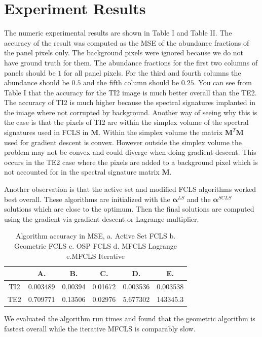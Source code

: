\documentclass[journal]{IEEEtran}
\begin{document}
\section{Experiment Results}
The numeric experimental results are shown in Table I and Table II. The accuracy of the result was computed as the MSE of the abundance fractions of the panel pixels only. The background pixels were ignored because we do not have ground truth for them. The abundance fractions for the first two columns of panels should be \(1\) for all panel pixels. For the third and fourth columns the abundance should be \(0.5\) and the fifth column should be \(0.25\). You can see from Table I that the accuracy for the TI2 image is much better overall than the TE2. The accuracy of TI2 is much higher because the spectral signatures implanted in the image where not corrupted by background. Another way of seeing why this is the case is that the pixels of TI2 are within the simplex volume of the spectral signatures used in FCLS in \(\mathbf{M}\). Within the simplex volume the matrix \(\mathbf{M}^T\mathbf{M}\) used for gradient descent is convex. However outside the simplex volume the problem may not be convex and could diverge when doing gradient descent. This occurs in the TE2 case where the pixels are added to a background pixel which is not accounted for in the spectral signature matrix \(\mathbf{M}\).

Another observation is that the active set and modified FCLS algorithms worked best overall. These algorithms are initialized with the \(\mathbf{\alpha}^{LS}\) and the \(\mathbf{\alpha}^{SCLS}\) solutions which are close to the optimum. Then the final solutions are computed using the gradient via gradient descent or Lagrange multiplier.

\begin{table}[!h]
    \caption{Algorithm accuracy in MSE, a. Active Set FCLS b. Geometric FCLS c. OSP FCLS d. MFCLS Lagrange e.MFCLS Iterative}
    \centering
    \begin{tabular}{|c|c|c|c|c|c|}
    \hline
        & A. & B. & C. & D. & E. \\ \hline
    TI2 & 0.003489& 0.00394& 0.01672& 0.003536& 0.003538\\ \hline
    TE2 & 0.709771& 0.13506& 0.02976& 5.677302& 143345.3 \\ \hline
    \end{tabular}
\end{table}

We evaluated the algorithm run times and found that the geometric algorithm is fastest overall while the iterative MFCLS is comparably slow.
\end{document}
